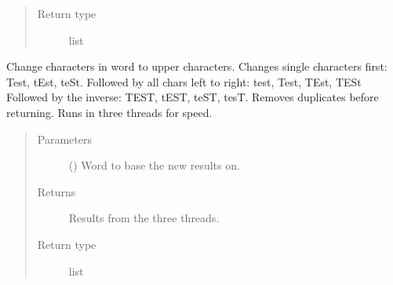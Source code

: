 \documentclass[letterpaper,10pt,english]{sphinxmanual}
\begin{document}
\begin{fulllineitems}
\begin{fulllineitems}
\begin{quote}
\begin{description}
\item[{Return type}] \leavevmode
\sphinxAtStartPar
list

\end{description}\end{quote}

\end{fulllineitems}


\begin{fulllineitems}
\label{\detokenize{EntroPass:EntroPass.pwd_gen.Pwd_gen.upper_perms}}
\sphinxAtStartPar
Change characters in word to upper characters. Changes single characters first:
Test, tEst, teSt. Followed by all chars left to right: test, Test, TEst, TESt
Followed by the inverse: TEST, tEST, teST, tesT.
Removes duplicates before returning.
Runs in three threads for speed.
\begin{quote}\begin{description}
\item[{Parameters}] \leavevmode
\sphinxAtStartPar
{} () \textendash{} Word to base the new results on.

\item[{Returns}] \leavevmode
\sphinxAtStartPar
{} \textendash{} Results from the three threads.

\item[{Return type}] \leavevmode
\sphinxAtStartPar
list

\end{description}\end{quote}

\end{fulllineitems}



\end{fulllineitems}
\end{document}
